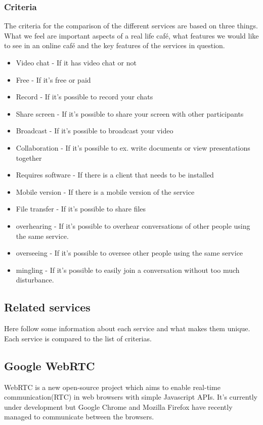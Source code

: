 \documentclass[12pt, titlepage]{article}
\begin{document}
\subsubsection{Criteria}
The criteria for the comparison of the different services are based on three things. What we feel are important aspects of a real life café, what features we would like to see in an online café and the key features of the services in question.
\begin{itemize}
\item Video chat - If it has video chat or not
\item Free - If it’s free or paid
\item Record - If it's possible to record your chats
\item Share screen - If it's possible to share your screen with other participants
\item Broadcast - If it's possible to broadcast your video
\item Collaboration - If it's possible to ex. write documents or view presentations together
\item Requires software - If there is a client that needs to be installed
\item Mobile version - If there is a mobile version of the service
\item File transfer - If it's possible to share files
\item overhearing - If it's possible to overhear conversations of other people using the same service.
\item overseeing - If it's possible to oversee other people using the same service
\item mingling - If it's possible to easily join a conversation without too much disturbance.
\end{itemize}
\subsection{Related services}
Here follow some information about each service and what makes them unique. Each service is compared to the list of criterias.
\subsection{Google WebRTC}
WebRTC is a new open-source project which aims to enable real-time communication(RTC) in web browsers with simple Javascript APIs. It's currently under development but Google Chrome and Mozilla Firefox have recently managed to communicate between the browsers\cite{13}.
\end{document}
